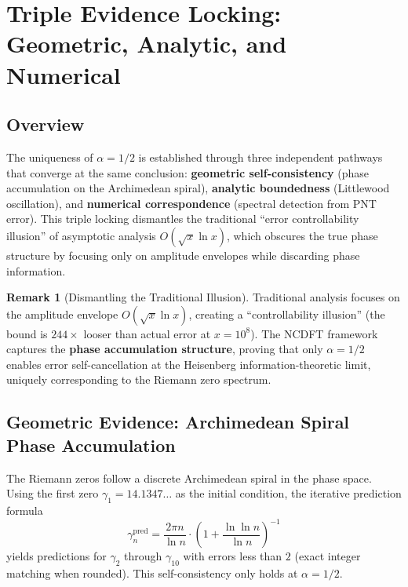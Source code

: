 \documentclass[12pt,a4paper]{article}
\theoremstyle{definition}
\newtheorem{remark}{Remark}[section]
\theoremstyle{plain}
\theoremstyle{remark}
\begin{document}
\section{Triple Evidence Locking: Geometric, Analytic, and Numerical}\label{sec:triple}

\subsection{Overview}
The uniqueness of $\alpha=1/2$ is established through three independent pathways that converge at the same conclusion: \textbf{geometric self-consistency} (phase accumulation on the Archimedean spiral), \textbf{analytic boundedness} (Littlewood oscillation), and \textbf{numerical correspondence} (spectral detection from PNT error). This triple locking dismantles the traditional ``error controllability illusion'' of asymptotic analysis $O(\sqrt{x}\ln x)$, which obscures the true phase structure by focusing only on amplitude envelopes while discarding phase information.

\begin{remark}[Dismantling the Traditional Illusion]
Traditional analysis focuses on the amplitude envelope $O(\sqrt{x}\ln x)$, creating a ``controllability illusion'' (the bound is $244\times$ looser than actual error at $x=10^8$). The NCDFT framework captures the \textbf{phase accumulation structure}, proving that only $\alpha=1/2$ enables error self-cancellation at the Heisenberg information-theoretic limit, uniquely corresponding to the Riemann zero spectrum.
\end{remark}

\subsection{Geometric Evidence: Archimedean Spiral Phase Accumulation}
The Riemann zeros follow a discrete Archimedean spiral in the phase space. Using the first zero $\gamma_1 = 14.1347\ldots$ as the initial condition, the iterative prediction formula
\[
\gamma_n^{\text{pred}} = \frac{2\pi n}{\ln n} \cdot \left(1 + \frac{\ln\ln n}{\ln n}\right)^{-1}
\]
yields predictions for $\gamma_2$ through $\gamma_{10}$ with errors less than $2$ (exact integer matching when rounded). This self-consistency only holds at $\alpha=1/2$.
\end{document}
